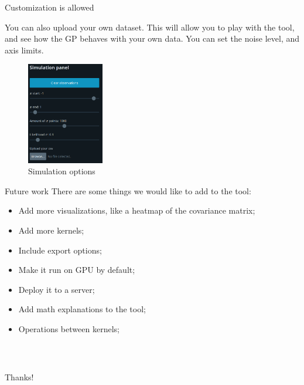 \documentclass[xcolor=dvipsnames,t,aspectratio=169]{beamer} %
\newcommand{\highlight}[1]{{\color{fgv_light_blue} #1}}
\begin{document}
\begin{frame}[c]{Customization \highlight{is} allowed}
    \begin{multicols}{2}
    You can also \highlight{upload} your own dataset. This will allow you to \highlight{play} with the tool, and see how the GP behaves with your own data. You can set the \highlight{noise} level, and axis \highlight{limits}.

    \begin{figure}[H]
        \centering
        \includegraphics[width=0.30\textwidth]{../imgs/simulation.png}
        \caption{Simulation options}
    \end{figure}
    \end{multicols}
\end{frame}

\begin{frame}[c]{Future \highlight{work}}
    There are some things we would like to add to the tool:

    \begin{itemize}
        \item Add \highlight{more} visualizations, like a heatmap of the covariance matrix;
        \item Add more \highlight{kernels};
        \item Include \highlight{export} options;
        \item Make it run on \highlight{GPU} by default;
        \item Deploy it to a \highlight{server};
        \item Add math \highlight{explanations} to the tool;
        \item Operations between \highlight{kernels};
    \end{itemize}
    
\end{frame}

\begin{frame}[c]
\frametitle{~}
    
    \begin{center}
        {\Huge Thanks!}
    \end{center}
    
\end{frame}
\end{document}
